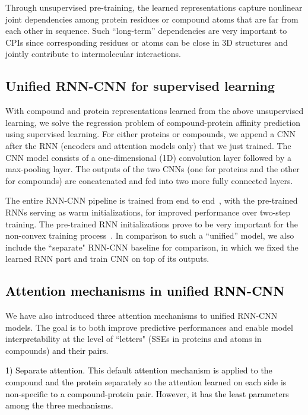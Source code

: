 \documentclass[nocrop]{bioinfo}
\newcommand{\red}[1]{\textcolor{black}{#1}}
\begin{document}
Through unsupervised pre-training, the learned representations capture nonlinear joint dependencies among protein residues or compound atoms that are far from each other in sequence. Such ``long-term'' dependencies are very important to CPIs since corresponding residues or atoms can be close in 3D structures and jointly contribute to intermolecular interactions. 





\vspace{-1em}
\subsection{Unified RNN-CNN for supervised learning}

With compound and protein representations learned from the above unsupervised learning, we solve the regression problem of compound-protein affinity prediction using supervised learning. For either proteins or compounds, we append a CNN after the RNN  (encoders and attention models only) that we just trained. The CNN model consists of a one-dimensional  (1D) convolution layer followed by a max-pooling layer. The outputs of the two CNNs  (one for proteins and the other for compounds) are concatenated and fed into two more fully connected layers.  

The entire RNN-CNN pipeline is trained from end to end~\citep{wang2016studying}, with the pre-trained RNNs serving as warm initializations, for improved performance over two-step training. The pre-trained RNN initializations prove to be very important for the non-convex training process~\citep{sutskever2013importance}. In comparison to such a ``unified'' model, we also include the ``separate" RNN-CNN baseline for comparison, in which we fixed the learned RNN part and train CNN on top of its outputs.  

\subsection{\red{Attention mechanisms in unified RNN-CNN}}
We have also introduced \red{three} attention mechanisms to unified RNN-CNN models.  The goal is to both improve predictive performances and  enable model interpretability at the level of ``letters"  (SSEs in proteins and atoms in compounds) \red{and their pairs}.  

\red{1) Separate attention. This default attention mechanism is applied  to the compound and the protein separately so the attention learned on each side is non-specific to a compound-protein pair. However, it has the least parameters among the three mechanisms.}
\end{document}
